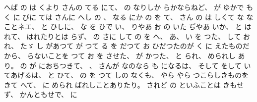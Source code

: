 へば
の
は
くより
さんの
てる
にて、
%
の
なりしか
らかならねど、
%
が
ゆかで
も
く
に
びに
ては
さんに
へし
の
、
%
なる
にか
の
を
て、
%
さん
の
は
しくて
な
なことネエ、
%
と
ひしに、
%
な
を
ひで
い、
%
りやあ
お
の
いた
ぢやあ
いか、
%
と
はれて、
%
はれたりとは
らず、
%
の
さに
して
の
を
へ、
%
あ、
%
い
を
つた、
%
して%
お
れ、
%
たゞ
し
があつて
が
つて
る
を
だつて
お
ひだつたのが
く
に
えたものだから、
%
らないことを
つて
お
を
させた、
%
が
かつた、
%
と
られ、
%
められし
あり。%
%
の
が
におちつきて、
%
、
%
さんが
なのなら
も
になるは、
%
そして
をして
いてあげるは、
%
と
ひて、
%
の
を
つて
しの
なくも、
%
やら
やら
つこらしきものを
きて
へて、
%
に
められ
ばれしことありたり。
%
されど
の
といふことは
きもせず、
%
かんともせで、
%
に
